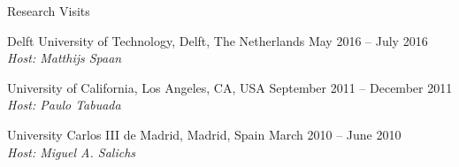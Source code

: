 
\begin{rSection}{Research Visits}

\item Delft University of Technology, Delft, The Netherlands \hfill May 2016 -- July 2016\\
\textit{Host: Matthijs Spaan}

\item University of California, Los Angeles, CA, USA \hfill September 2011 -- December 2011\\
\textit{Host: Paulo Tabuada}

\item University Carlos III de Madrid, Madrid, Spain \hfill March 2010 -- June 2010\\
\textit{Host: Miguel A. Salichs}

\end{rSection}

